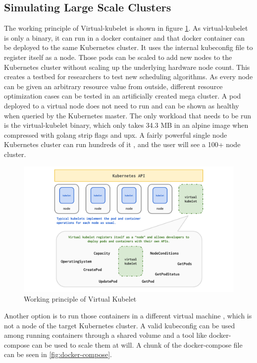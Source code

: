 \subsection{Simulating Large Scale Clusters}
The working principle of Virtual-kubelet is shown in figure \ref{fig:vk}. As virtual-kubelet is only a binary, it can run in a docker container and that docker container can be deployed to the same Kubernetes cluster. It uses the internal kubeconfig file to register itself as a node. Those pods can be scaled to add new nodes to the Kubernetes cluster without scaling up the underlying hardware node count. This creates a testbed for researchers to test new scheduling algorithms. As every node can be given an arbitrary resource value from outside, different resource optimization cases can be tested in an artificially created mega cluster. A pod deployed to a virtual node does not need to run and can be shown as healthy when queried by the Kubernetes master. The only workload that needs to be run is the virtual-kubelet binary, which only takes 34.3 MB in an alpine image when compressed with golang strip flags and upx. A fairly powerful single node Kubernetes cluster can run hundreds of it , and the user will see a 100+ node cluster.

\begin{figure}[htpb]
  \centering
  \includegraphics[width=1\textwidth]{figures/diagram.pdf}
  \caption{Working principle of Virtual Kubelet \cite{virtual}} \label{fig:vk}
\end{figure}

Another option is to run those containers in a different virtual machine , which is not a node of the target Kubernetes cluster. A valid kubeconfig can be used among running containers through a shared volume and a tool like docker-compose can be used to scale them at will. A chunk of the docker-compose file can be seen in \ref{fig:docker-compose}.

